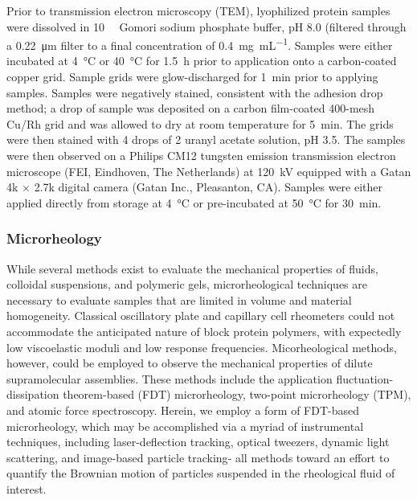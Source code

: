 \begin{refsection}
Prior to transmission electron microscopy (TEM), lyophilized protein samples
were dissolved in \SI{10}{\milli\moLar} Gomori sodium phosphate buffer, pH 8.0 (filtered through
a \SI{0.22}{\um} filter to a final concentration of \SI{0.4}{\mg\per\mL}.
Samples were either incubated at \SI{4}{\celsius} or \SI{40}{\celsius} for
\SI{1.5}{\hour} prior to application onto a carbon-coated copper grid. Sample
grids were glow-discharged for \SI{1}{\minute} prior to applying samples.
Samples were negatively stained, consistent with the adhesion drop method; a
drop of sample was deposited on a carbon film-coated 400-mesh Cu/Rh grid and was
allowed to dry at room temperature for \SI{5}{\minute}. The grids were then
stained with 4 drops of \SI{2}{\volper} uranyl acetate solution, pH 3.5. The
samples were then observed on a Philips CM12 tungsten emission transmission
electron microscope (FEI, Eindhoven, The Netherlands) at \SI{120}{\kV} equipped
with a Gatan 4k ${\times}$ 2.7k digital camera (Gatan Inc., Pleasanton, CA).
Samples were either applied directly from storage at \SI{4}{\celsius} or
pre-incubated at \SI{50}{\celsius} for \SI{30}{\minute}.

\subsubsection{Microrheology}
While several methods exist to evaluate the mechanical properties of fluids,
colloidal suspensions, and polymeric gels, microrheological techniques are
necessary to evaluate samples that are limited in volume and material
homogeneity.\cite{Chen2010a} Classical oscillatory plate and capillary cell rheometers could not
accommodate the anticipated nature of block protein polymers, with expectedly
low viscoelastic moduli and low response frequencies. Micorheological methods,
however, could be employed to observe the mechanical properties of dilute
supramolecular assemblies. These methods include the application
fluctuation-dissipation theorem-based (FDT)
microrheology,\cite{Gittes1997,Mason1997,Mason1997a} two-point microrheology
(TPM),\cite{Crocker2000,Levine2000,Qiu2004,Levine2001} and atomic force
spectroscopy.\cite{Salman2002,Caspi2002} Herein, we employ a form of FDT-based
microrheology, which may be accomplished via a myriad of instrumental
techniques, including laser-deflection tracking,\cite{Gittes1997,Mason1997}
optical tweezers,\cite{Starrs2003,Addas2004} dynamic light
scattering,\cite{Dasgupta2002,Popescu2002} and image-based particle
tracking\cite{Valentine2004,Crocker2000,Chen2003}- all methods toward an effort
to quantify the Brownian motion of particles suspended in the rheological fluid
of interest.


\end{refsection}
